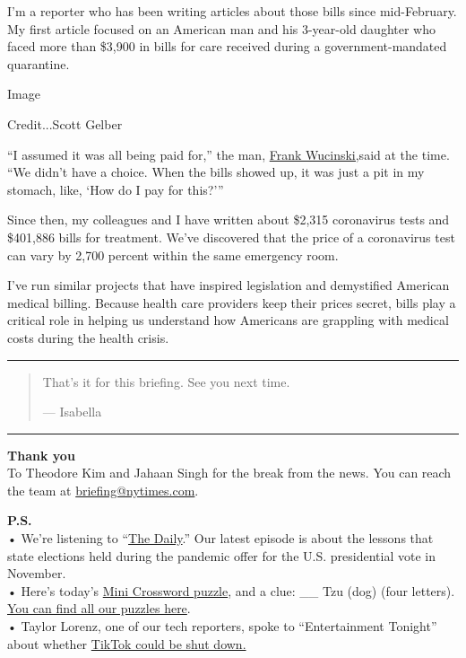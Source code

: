 I'm a reporter who has been writing articles about those bills since
mid-February. My first article focused on an American man and his
3-year-old daughter who faced more than \$3,900 in bills for care
received during a government-mandated quarantine.

Image

Credit...Scott Gelber

``I assumed it was all being paid for,'' the man,
\href{https://www.nytimes.com/2020/02/29/upshot/coronavirus-surprise-medical-bills.html}{Frank
Wucinski,}said at the time. ``We didn't have a choice. When the bills
showed up, it was just a pit in my stomach, like, `How do I pay for
this?'''

Since then, my colleagues and I have written about \$2,315 coronavirus
tests and \$401,886 bills for treatment. We've discovered that the price
of a coronavirus test can vary by 2,700 percent within the same
emergency room.

I've run similar projects that have inspired legislation and demystified
American medical billing. Because health care providers keep their
prices secret, bills play a critical role in helping us understand how
Americans are grappling with medical costs during the health crisis.

\begin{center}\rule{0.5\linewidth}{\linethickness}\end{center}

\begin{quote}
That's it for this briefing. See you next time.

--- Isabella
\end{quote}

\begin{center}\rule{0.5\linewidth}{\linethickness}\end{center}

\textbf{Thank you}\\
To Theodore Kim and Jahaan Singh for the break from the news. You can
reach the team at
\href{mailto:briefing+midnight@nytimes.com?subject=Briefing\%20Feedback}{briefing@nytimes.com}.

\textbf{P.S.}\\
• We're listening to ``\href{https://www.nytimes.com/thedaily}{The
Daily}.'' Our latest episode is about the lessons that state elections
held during the pandemic offer for the U.S. presidential vote in
November.\\
• Here's today's
\href{https://www.nytimes.com/crosswords/game/mini}{Mini Crossword
puzzle}, and a clue: \_\_ Tzu (dog) (four letters).
\href{https://www.nytimes.com/crosswords}{You can find all our puzzles
here}.\\
• Taylor Lorenz, one of our tech reporters, spoke to ``Entertainment
Tonight'' about whether
\href{https://www.etonline.com/could-tiktok-really-get-shut-down-heres-what-you-need-to-know-150710}{TikTok
could be shut down.}


